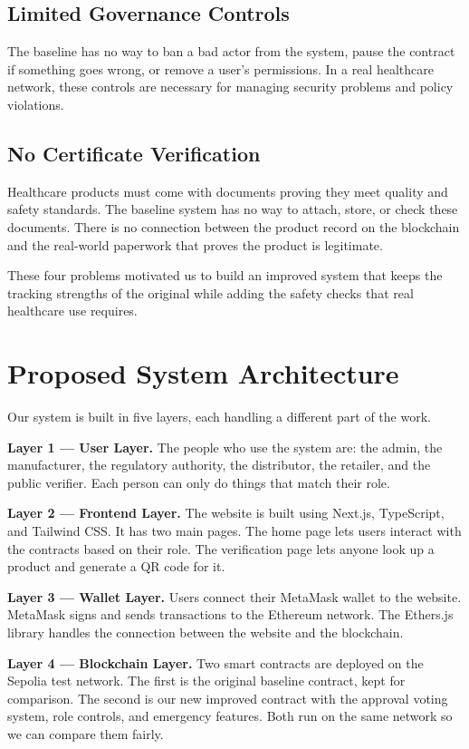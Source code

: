 \documentclass[conference]{IEEEtran}
\begin{document}
\subsection{Limited Governance Controls}

The baseline has no way to ban a bad actor from the system, pause the contract if something goes wrong, or remove a user's permissions. In a real healthcare network, these controls are necessary for managing security problems and policy violations.

\subsection{No Certificate Verification}

Healthcare products must come with documents proving they meet quality and safety standards. The baseline system has no way to attach, store, or check these documents. There is no connection between the product record on the blockchain and the real-world paperwork that proves the product is legitimate.

These four problems motivated us to build an improved system that keeps the tracking strengths of the original while adding the safety checks that real healthcare use requires.

\section{Proposed System Architecture}

Our system is built in five layers, each handling a different part of the work.

\textbf{Layer 1 --- User Layer.} The people who use the system are: the admin, the manufacturer, the regulatory authority, the distributor, the retailer, and the public verifier. Each person can only do things that match their role.

\textbf{Layer 2 --- Frontend Layer.} The website is built using Next.js, TypeScript, and Tailwind CSS. It has two main pages. The home page lets users interact with the contracts based on their role. The verification page lets anyone look up a product and generate a QR code for it.

\textbf{Layer 3 --- Wallet Layer.} Users connect their MetaMask wallet to the website. MetaMask signs and sends transactions to the Ethereum network. The Ethers.js library handles the connection between the website and the blockchain.

\textbf{Layer 4 --- Blockchain Layer.} Two smart contracts are deployed on the Sepolia test network. The first is the original baseline contract, kept for comparison. The second is our new improved contract with the approval voting system, role controls, and emergency features. Both run on the same network so we can compare them fairly.
\end{document}
